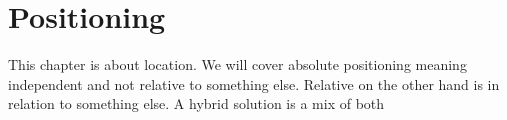 \chapter{Positioning} \label{ch:positioning}
This chapter is about location. We will cover absolute positioning meaning independent and not relative to something else. Relative on the other hand is in relation to something else. A hybrid solution is a mix of both



